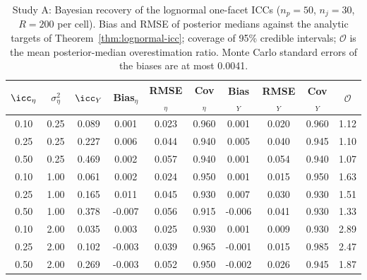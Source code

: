 \begin{table}[H]
\centering
\caption{Study A: Bayesian recovery of the lognormal one-facet ICCs ($n_p = 50$, $n_j = 30$, $R = 200$ per cell). Bias and RMSE of posterior medians against the analytic targets of Theorem~\ref{thm:lognormal-icc}; coverage of 95\% credible intervals; $\mathcal{O}$ is the mean posterior-median overestimation ratio. Monte Carlo standard errors of the biases are at most 
0.0041.}
\label{tab:sim-A}
\small
\begin{tabular}{cccccccccc}
\toprule
$\icc_\eta$ & $\sigma^2_\eta$ & $\icc_Y$ & Bias$_\eta$ & RMSE$_\eta$ & Cov$_\eta$ & Bias$_Y$ & RMSE$_Y$ & Cov$_Y$ & $\mathcal{O}$ \\
\midrule
0.10 & 0.25 & 0.089 & 0.001 & 0.023 & 0.960 & 0.001 & 0.020 & 0.960 & 1.12 \\
0.25 & 0.25 & 0.227 & 0.006 & 0.044 & 0.940 & 0.005 & 0.040 & 0.945 & 1.10 \\
0.50 & 0.25 & 0.469 & 0.002 & 0.057 & 0.940 & 0.001 & 0.054 & 0.940 & 1.07 \\
0.10 & 1.00 & 0.061 & 0.002 & 0.024 & 0.950 & 0.001 & 0.015 & 0.950 & 1.63 \\
0.25 & 1.00 & 0.165 & 0.011 & 0.045 & 0.930 & 0.007 & 0.030 & 0.930 & 1.51 \\
0.50 & 1.00 & 0.378 & -0.007 & 0.056 & 0.915 & -0.006 & 0.041 & 0.930 & 1.33 \\
0.10 & 2.00 & 0.035 & 0.003 & 0.025 & 0.930 & 0.001 & 0.009 & 0.930 & 2.89 \\
0.25 & 2.00 & 0.102 & -0.003 & 0.039 & 0.965 & -0.001 & 0.015 & 0.985 & 2.47 \\
0.50 & 2.00 & 0.269 & -0.003 & 0.052 & 0.950 & -0.002 & 0.026 & 0.945 & 1.87 \\
\bottomrule
\end{tabular}
\end{table}
